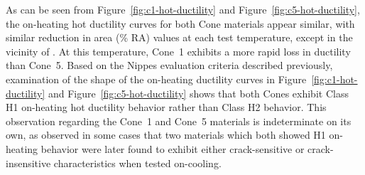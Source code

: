 {As can be seen from Figure~\ref{fig:c1-hot-ductility} and Figure~\ref{fig:c5-hot-ductility}, the on-heating hot ductility curves for both Cone materials appear similar, with similar reduction in area (\% RA) values at each test temperature, except in the vicinity of .  At this temperature, Cone~1 exhibits a more rapid loss in ductility than Cone~5.  Based on the Nippes evaluation criteria \cite{nippes_further_1957} described previously, examination of the shape of the on-heating ductility curves in Figure~\ref{fig:c1-hot-ductility} and Figure~\ref{fig:c5-hot-ductility} shows that both Cones exhibit Class H1 on-heating hot ductility behavior rather than Class H2 behavior.  This observation regarding the Cone~1 and Cone~5 materials is indeterminate on its own, as \citet{nippes_further_1957} observed in some cases that two materials which both showed H1 on-heating behavior were later found to exhibit either crack-sensitive or crack-insensitive characteristics when tested on-cooling.

}

